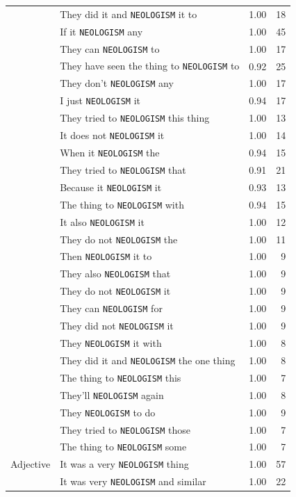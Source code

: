 \begin{table}[t]
\begin{tabular}{llrr}
 & They did it and \texttt{NEOLOGISM} it to & 1.00 & 18 \\
 & If it \texttt{NEOLOGISM} any & 1.00 & 45 \\
 & They can \texttt{NEOLOGISM} to & 1.00 & 17 \\
 & They have seen the thing to \texttt{NEOLOGISM} to & 0.92 & 25 \\
 & They don't \texttt{NEOLOGISM} any & 1.00 & 17 \\
 & I just \texttt{NEOLOGISM} it & 0.94 & 17 \\
 & They tried to \texttt{NEOLOGISM} this thing & 1.00 & 13 \\
 & It does not \texttt{NEOLOGISM} it & 1.00 & 14 \\
 & When it \texttt{NEOLOGISM} the & 0.94 & 15 \\
 & They tried to \texttt{NEOLOGISM} that & 0.91 & 21 \\
 & Because it \texttt{NEOLOGISM} it & 0.93 & 13 \\
 & The thing to \texttt{NEOLOGISM} with & 0.94 & 15 \\
 & It also \texttt{NEOLOGISM} it & 1.00 & 12 \\
 & They do not \texttt{NEOLOGISM} the & 1.00 & 11 \\
 & Then \texttt{NEOLOGISM} it to & 1.00 & 9 \\
 & They also \texttt{NEOLOGISM} that & 1.00 & 9 \\
 & They do not \texttt{NEOLOGISM} it & 1.00 & 9 \\
 & They can \texttt{NEOLOGISM} for & 1.00 & 9 \\
 & They did not \texttt{NEOLOGISM} it & 1.00 & 9 \\
 & They \texttt{NEOLOGISM} it with & 1.00 & 8 \\
 & They did it and \texttt{NEOLOGISM} the one thing & 1.00 & 8 \\
 & The thing to \texttt{NEOLOGISM} this & 1.00 & 7 \\
 & They'll \texttt{NEOLOGISM} again & 1.00 & 8 \\
 & They \texttt{NEOLOGISM} to do & 1.00 & 9 \\
 & They tried to \texttt{NEOLOGISM} those & 1.00 & 7 \\
 & The thing to \texttt{NEOLOGISM} some & 1.00 & 7 \\
\midrule
Adjective & It was a very \texttt{NEOLOGISM} thing & 1.00 & 57 \\
 & It was very \texttt{NEOLOGISM} and similar & 1.00 & 22 \\

\end{tabular}
\end{table}
